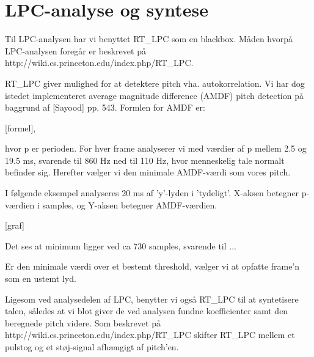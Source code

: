\section{LPC-analyse og syntese}
Til LPC-analysen har vi benyttet RT_LPC som en blackbox. Måden hvorpå LPC-analysen foregår er beskrevet på http://wiki.cs.princeton.edu/index.php/RT_LPC.

RT_LPC giver mulighed for at detektere pitch vha. autokorrelation. Vi har dog istedet implementeret average magnitude difference (AMDF) pitch detection på baggrund af [Sayood] pp. 543. Formlen for AMDF er:

[formel],

hvor p er perioden. For hver frame analyserer vi med værdier af p mellem 2.5 og 19.5 ms, svarende til 860 Hz ned til 110 Hz, hvor menneskelig tale normalt befinder sig. Herefter vælger vi den minimale AMDF-værdi som vores pitch.

I følgende eksempel analyseres 20 ms af 'y'-lyden i 'tydeligt'. X-aksen betegner p-værdien i samples, og Y-aksen betegner AMDF-værdien.

[graf]

Det ses at minimum ligger ved ca 730 samples, svarende til ... 
 

Er den minimale værdi over et bestemt threshold, vælger vi at opfatte frame'n som en ustemt lyd.

Ligesom ved analysedelen af LPC, benytter vi også RT_LPC til at syntetisere talen, således at vi blot giver de ved analysen fundne koefficienter samt den beregnede pitch videre. Som beskrevet på http://wiki.cs.princeton.edu/index.php/RT_LPC skifter RT_LPC mellem et pulstog og et støj-signal afhængigt af pitch'en.

